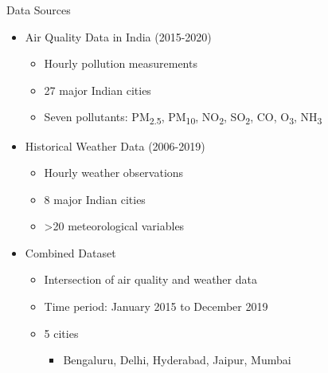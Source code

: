 \documentclass[svgnames, 12pt]{beamer}
\begin{document}
\begin{frame}{Data Sources}
    \begin{itemize}
       \item Air Quality Data in India (2015-2020)
           \begin{itemize}
               \item Hourly pollution measurements
               \item 27 major Indian cities
               \item Seven pollutants: PM\textsubscript{2.5}, PM\textsubscript{10}, NO\textsubscript{2}, SO\textsubscript{2}, CO, O\textsubscript{3}, NH\textsubscript{3}
           \end{itemize}
       \vspace{0.5em}
       \item Historical Weather Data (2006-2019)
           \begin{itemize}
               \item Hourly weather observations
               \item 8 major Indian cities
               \item >20 meteorological variables
           \end{itemize}
       \vspace{0.5em}
       \item Combined Dataset
           \begin{itemize}
               \item Intersection of air quality and weather data
               \item Time period: January 2015 to December 2019
               \item 5 cities
                   \begin{itemize}
                       \item Bengaluru, Delhi, Hyderabad, Jaipur, Mumbai
                   \end{itemize}
           \end{itemize}
    \end{itemize}
    \vfill
\end{frame}
\end{document}
